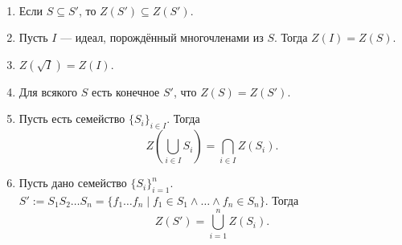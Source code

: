 \documentclass[12pt,a4paper]{article}
\begin{document}
    \begin{lemma}\ 
        \begin{enumerate}
            \item Если $S \subseteq S'$, то $Z(S') \subseteq Z(S')$.
            \item Пусть $I$ --- идеал, порождённый многочленами из $S$. Тогда $Z(I) = Z(S)$.
            \item $Z(\sqrt{I}) = Z(I)$.
            \item Для всякого $S$ есть конечное $S'$, что $Z(S) = Z(S')$.
            \item Пусть есть семейство $\{S_i\}_{i \in I}$. Тогда
                \[Z\left(\bigcup_{i \in I} S_i\right) = \bigcap_{i \in I} Z(S_i).\]
            \item Пусть дано семейство $\{S_i\}_{i=1}^n$. $S' := S_1 S_2 \dots S_n = \{f_1 \dots f_n \mid f_1 \in S_1 \wedge \dots \wedge f_n \in S_n\}$. Тогда
                \[Z(S') = \bigcup_{i = 1}^n Z(S_i).\]
        \end{enumerate}
    \end{lemma}
\end{document}
